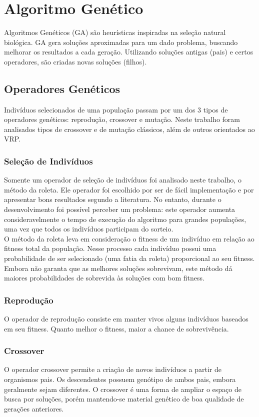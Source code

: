 \documentclass[conference]{IEEEtran}
\begin{document}
\section{Algoritmo Genético}
Algoritmos Genéticos (GA) são heurísticas inspiradas na seleção natural biológica. GA gera soluções aproximadas para um dado problema, buscando melhorar os resultados a cada geração. Utilizando soluções antigas (pais) e certos operadores, são criadas novas soluções (filhos).

\subsection{Operadores Genéticos}
Indivíduos selecionados de uma população passam por um dos 3 tipos de operadores genéticos: reprodução, crossover e mutação. Neste trabalho foram analisados tipos de crossover e de mutação clássicos, além de outros orientados ao VRP.\\

\subsubsection{Seleção de Indivíduos}
Somente um operador de seleção de indivíduos foi analisado neste trabalho, o método da roleta. Ele operador foi escolhido por ser de fácil implementação e por apresentar bons resultados segundo a literatura. No entanto, durante o desenvolvimento foi possível perceber um problema: este operador aumenta consideravelmente o tempo de execução do algoritmo para grandes populações, uma vez que todos os indivíduos participam do sorteio.\\
O método da roleta leva em consideração o fitness de um indivíduo em relação ao fitness total da população. Nesse processo cada indivíduo possui uma probabilidade de ser selecionado (uma fatia da roleta) proporcional ao seu fitness. Embora não garanta que as melhores soluções sobrevivam, este método dá maiores probabilidades de sobrevida às soluções com bom fitness.

\subsubsection{Reprodução}
O operador de reprodução consiste em manter vivos alguns indivíduos baseados em seu fitness. Quanto melhor o fitness, maior a chance de sobrevivência.

\subsubsection{Crossover}
O operador crossover permite a criação de novos indivíduos a partir de organismos pais. Os descendentes possuem genótipo de ambos pais, embora geralmente sejam diferentes. O crossover é uma forma de ampliar o espaço de busca por soluções, porém mantendo-se material genético de boa qualidade de gerações anteriores.
\end{document}
